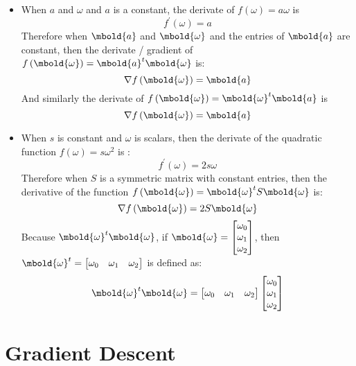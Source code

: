 \documentclass[12pt letter]{report}
\begin{document}
\begin{itemize}
  \item When $a$ and $\omega$ and $a$ is a constant, the derivate of $f \left( \omega \right) = a \omega $ is
        \[
          f^{\prime} \left( \omega \right) = a
        \]
        Therefore when $\mbold{a}$ and $\mbold{\omega}$ and the entries of $\mbold{a}$ are constant, then the derivate /
        gradient of $f \left( \mbold{\omega} \right) = \mbold{a}^t \mbold{\omega} $ is:
        \[
          \nabla f \left( \mbold{\omega} \right)  = \mbold{a}
        \]
        And similarly the derivate of  $f \left( \mbold{\omega}\right) = \mbold{\omega}^{t} \mbold{a}  $ is
        \[
          \nabla f \left( \mbold{\omega} \right) = \mbold{a}
        \]
  \item When $s$ is constant and $\omega$ is scalars, then the derivate of the quadratic function $f \left( \omega \right) =
          s\omega^2$ is :
        \[
          f ^{\prime} \left( \omega \right)  = 2s \omega
        \]
        Therefore when $S$ is  a symmetric matrix with constant entries, then the derivative of the function $f \left( \mbold{\omega}
          \right) = \mbold{\omega}^{t}S \mbold{\omega}$ is:
        \[
          \nabla f \left( \mbold{\omega} \right) = 2S \mbold{\omega}
        \]
        Because $\mbold{\omega}^{t} \mbold{\omega}$, if $\mbold{\omega} = \begin{bmatrix} \omega_0 \\ \omega_1 \\
            \omega_2\end{bmatrix} $, then $\mbold{\omega}^{t} = \begin{bmatrix} \omega_0 & \omega_1 & \omega_2 \end{bmatrix} $ is defined as:
        \[
          \mbold{\omega}^{t} \mbold{\omega} = \begin{bmatrix} \omega_0 & \omega_1 & \omega_2 \end{bmatrix}  \begin{bmatrix}
            \omega_0 \\ \omega_1 \\
            \omega_2
          \end{bmatrix}
        \]
\end{itemize}

\section{Gradient Descent}\label{sec:grad}
\end{document}
